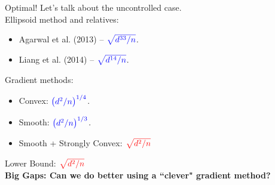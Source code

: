 \documentclass[portrait,a0paper,fontscale=0.285]{baposter} %
\begin{document}
\begin{poster}
{Optimal! Let's talk about the uncontrolled case.
\\[1ex]
Ellipsoid method and relatives:
\begin{itemize}
\item  Agarwal et al. (2013) --  $\color{blue}\sqrt{d^{33}/n}$.
\item Liang et al. (2014) -- $\color{blue}\sqrt{d^{14}/n}$.
\end{itemize}

Gradient methods:
\begin{itemize}
\item Convex: $\color{blue}\left( d^2/n \right)^{1/4}$.
\item Smooth: $\color{blue}\left( d^2/n \right)^{1/3}$.
\item Smooth + Strongly Convex: $\color{red}\sqrt{d^2/n}$
\end{itemize}

Lower Bound: $\color{red}\sqrt{d^2/n}$\\[0.5ex]

 \large \textbf{Big Gaps: Can we do better using a ``clever" gradient method?}
}




\end{poster}
\end{document}
